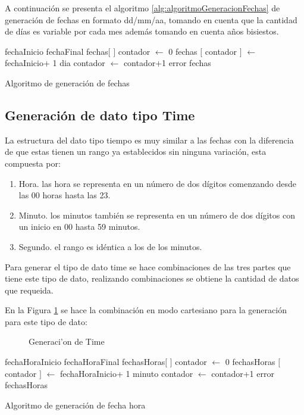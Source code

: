A continuaci\'on se presenta el algoritmo \ref{alg:algoritmoGeneracionFechas} de generaci\'on de fechas en formato dd/mm/aa, tomando en cuenta que la cantidad de d\'ias es variable por cada mes adem\'as tomando en cuenta a\~nos bisiestos.
\begin{algorithm}[H]
\begin{algorithmic}[1]
\REQUIRE fechaInicio fechaFinal
\STATE fechas$[$ $]$
\STATE contador $\leftarrow$ 0
	\STATE fechas $[$ contador $]$ $\leftarrow$ fechaInicio+ 1 dia
	\STATE contador $\leftarrow$ contador+1
	\ENDWHILE
\ELSE
	\RETURN error
\ENDIF
\RETURN fechas
\end{algorithmic}
\caption{Algoritmo de generaci\'on de fechas}\label{alg:algoritmoGeneracionFechas}
\end{algorithm}
\subsection{Generaci\'on de dato tipo Time}
La estructura del dato tipo tiempo es muy similar a las fechas con la diferencia de que estas tienen un rango ya establecidos sin ninguna variaci\'on, esta compuesta por:
\begin{enumerate}
\item Hora. las hora se representa en un n\'umero de dos d\'igitos comenzando desde las 00 horas hasta las 23.
\item Minuto. los minutos tambi\'en se representa en un n\'umero de dos d\'igitos con un inicio en 00 hasta 59 minutos.
\item Segundo. el rango es id\'entica a los de los minutos.
\end{enumerate}
Para generar el tipo de dato time se hace combinaciones de las tres partes que tiene este tipo de dato, realizando combinaciones se obtiene la cantidad de datos que requeida.

En la Figura \ref{fig:generacion de Time} se hace la combinaci\'on en modo cartesiano para la generaci\'on para este tipo de dato:

\begin{figure}[H]
\centering
{}
\caption{Generaci'on de Time} \label{fig:generacion de Time}
\end{figure}
\begin{algorithm}[H]
\begin{algorithmic}[1]
\REQUIRE fechaHoraInicio fechaHoraFinal
\STATE fechasHoras$[$ $]$
\STATE contador $\leftarrow$ 0
	\STATE fechasHoras $[$ contador $]$ $\leftarrow$ fechaHoraInicio+ 1 minuto
	\STATE contador $\leftarrow$ contador+1
	\ENDWHILE
\ELSE
	\RETURN error
\ENDIF
\RETURN fechasHoras
\end{algorithmic}
\caption{Algoritmo de generaci\'on de fecha hora}\label{alg:algoritmoGeneracionDateTime}
\end{algorithm}

